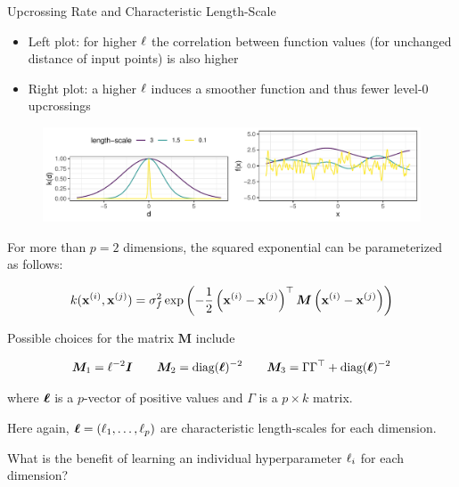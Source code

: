 \begin{frame}[c,allowframebreaks]{Upcrossing Rate and Characteristic Length-Scale}
\begin{itemize}
\item[\faLightbulbO] Left plot: for higher $\ell$ the correlation between function values (for unchanged distance of input points) is also higher
\item[\faLightbulbO] Right plot: a higher $\ell$ induces a smoother function and thus fewer level-0 upcrossings
\end{itemize}

\vspace{3mm}
\begin{figure}
	\includegraphics[width = .8\textwidth]{figure/lengthscale-1.pdf}
\end{figure}

\framebreak

For more than $p = 2$ dimensions, the squared exponential can be parameterized as follows:

$$
k(\mathbf{x}^{(i)}, \mathbf{x}^{(j)}) = \sigma^2_f \exp\,\biggl(- \frac{1}{2}\left(\mathbf{x}^{(i)} - \mathbf{x}^{(j)}\right)^\top\bm{M}\left(\mathbf{x}^{(i)} - \mathbf{x}^{(j)}\right)\biggr)
$$

\vspace{7mm}

Possible choices for the matrix $\bm{M}$ include

$$
\bm{M}_1 = \ell^{-2}\boldsymbol{I} \qquad \bm{M}_2 = \text{diag}(\bm{\ell})^{-2} \qquad \bm{M}_3 = \Gamma \Gamma^\top + \text{diag}(\bm{\ell})^{-2}
$$

where $\bm{\ell}$ is a $p$-vector of positive values and $\Gamma$ is a $p \times k$ matrix. 

\lz 
\lz

Here again, $\bm{\ell} = (\ell_1,\dots, \ell_p)$ are characteristic length-scales for each dimension. 


\framebreak

What is the benefit of learning an individual hyperparameter $\ell_i$ for each dimension?

\vspace{4mm}


\end{frame}
